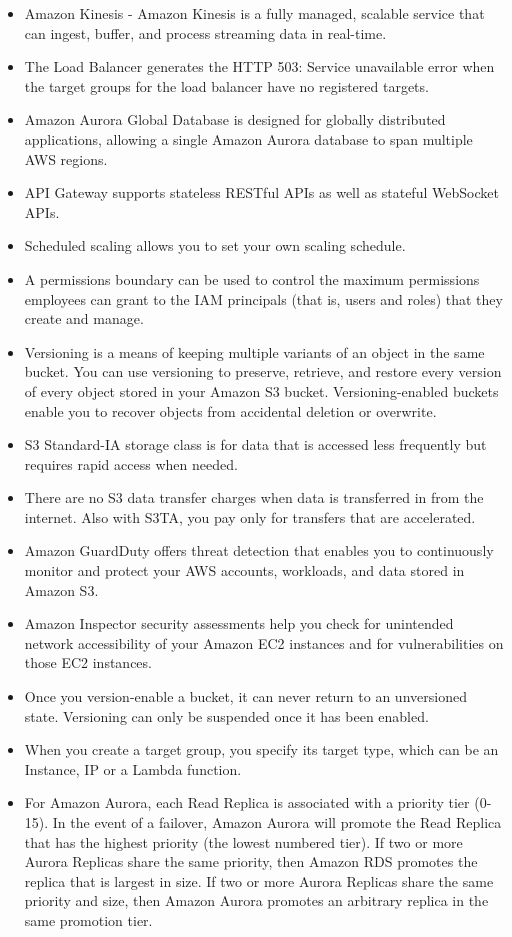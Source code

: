 \documentclass[]{scrartcl}
\begin{document}
\begin{itemize}
	\item Amazon Kinesis - Amazon Kinesis is a fully managed, scalable service that can ingest, buffer, and process streaming data in real-time.
	\item The Load Balancer generates the HTTP 503: Service unavailable error when the target groups for the load balancer have no registered targets.
	\item Amazon Aurora Global Database is designed for globally distributed applications, allowing a single Amazon Aurora database to span multiple AWS regions.
	\item API Gateway supports stateless RESTful APIs as well as stateful WebSocket APIs.
	\item Scheduled scaling allows you to set your own scaling schedule. 
	\item A permissions boundary can be used to control the maximum permissions employees can grant to the IAM principals (that is, users and roles) that they create and manage.
	\item Versioning is a means of keeping multiple variants of an object in the same bucket. You can use versioning to preserve, retrieve, and restore every version of every object stored in your Amazon S3 bucket. Versioning-enabled buckets enable you to recover objects from accidental deletion or overwrite.
	\item S3 Standard-IA storage class is for data that is accessed less frequently but requires rapid access when needed. 
	\item There are no S3 data transfer charges when data is transferred in from the internet. Also with S3TA, you pay only for transfers that are accelerated. 
	\item Amazon GuardDuty offers threat detection that enables you to continuously monitor and protect your AWS accounts, workloads, and data stored in Amazon S3.
	\item Amazon Inspector security assessments help you check for unintended network accessibility of your Amazon EC2 instances and for vulnerabilities on those EC2 instances. 
	\item Once you version-enable a bucket, it can never return to an unversioned state. Versioning can only be suspended once it has been enabled.
	\item When you create a target group, you specify its target type, which can be an Instance, IP or a Lambda function.
	\item For Amazon Aurora, each Read Replica is associated with a priority tier (0-15). In the event of a failover, Amazon Aurora will promote the Read Replica that has the highest priority (the lowest numbered tier). If two or more Aurora Replicas share the same priority, then Amazon RDS promotes the replica that is largest in size. If two or more Aurora Replicas share the same priority and size, then Amazon Aurora promotes an arbitrary replica in the same promotion tier.
\end{itemize}
\end{document}
